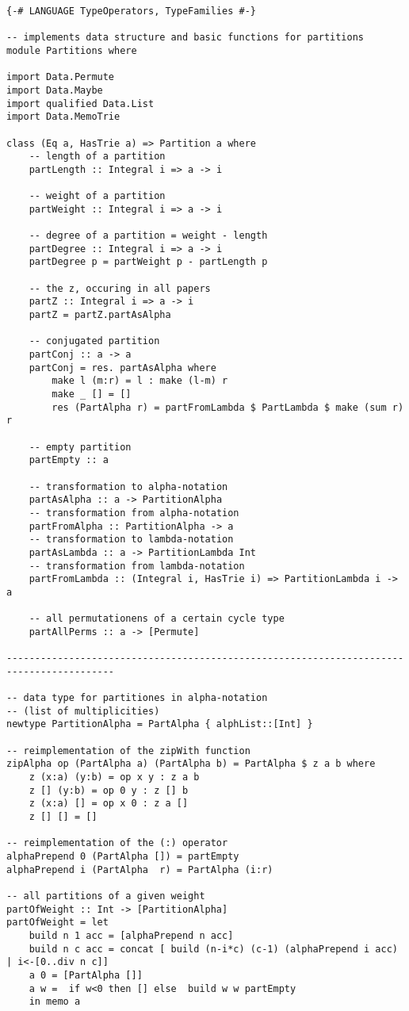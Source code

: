 \begin{lstlisting}
{-# LANGUAGE TypeOperators, TypeFamilies #-}

-- implements data structure and basic functions for partitions
module Partitions where

import Data.Permute
import Data.Maybe
import qualified Data.List 
import Data.MemoTrie

class (Eq a, HasTrie a) => Partition a where
	-- length of a partition
	partLength :: Integral i => a -> i 
	
	-- weight of a partition
	partWeight :: Integral i => a -> i
	
	-- degree of a partition = weight - length
	partDegree :: Integral i => a -> i
	partDegree p = partWeight p - partLength p
	
	-- the z, occuring in all papers
	partZ :: Integral i => a -> i
	partZ = partZ.partAsAlpha
	
	-- conjugated partition
	partConj :: a -> a
	partConj = res. partAsAlpha where
		make l (m:r) = l : make (l-m) r
		make _ [] = []
		res (PartAlpha r) = partFromLambda $ PartLambda $ make (sum r) r
	
	-- empty partition
	partEmpty :: a
	
	-- transformation to alpha-notation
	partAsAlpha :: a -> PartitionAlpha
	-- transformation from alpha-notation
	partFromAlpha :: PartitionAlpha -> a
	-- transformation to lambda-notation
	partAsLambda :: a -> PartitionLambda Int
	-- transformation from lambda-notation
	partFromLambda :: (Integral i, HasTrie i) => PartitionLambda i -> a
	
	-- all permutationens of a certain cycle type
	partAllPerms :: a -> [Permute]
	
-----------------------------------------------------------------------------------------

-- data type for partitiones in alpha-notation
-- (list of multiplicities)
newtype PartitionAlpha = PartAlpha { alphList::[Int] }

-- reimplementation of the zipWith function
zipAlpha op (PartAlpha a) (PartAlpha b) = PartAlpha $ z a b where
	z (x:a) (y:b) = op x y : z a b
	z [] (y:b) = op 0 y : z [] b
	z (x:a) [] = op x 0 : z a []
	z [] [] = []

-- reimplementation of the (:) operator
alphaPrepend 0 (PartAlpha []) = partEmpty
alphaPrepend i (PartAlpha  r) = PartAlpha (i:r)

-- all partitions of a given weight
partOfWeight :: Int -> [PartitionAlpha]
partOfWeight = let
	build n 1 acc = [alphaPrepend n acc]
	build n c acc = concat [ build (n-i*c) (c-1) (alphaPrepend i acc) | i<-[0..div n c]] 
	a 0 = [PartAlpha []]
	a w =  if w<0 then [] else  build w w partEmpty
	in memo a


\end{lstlisting}
